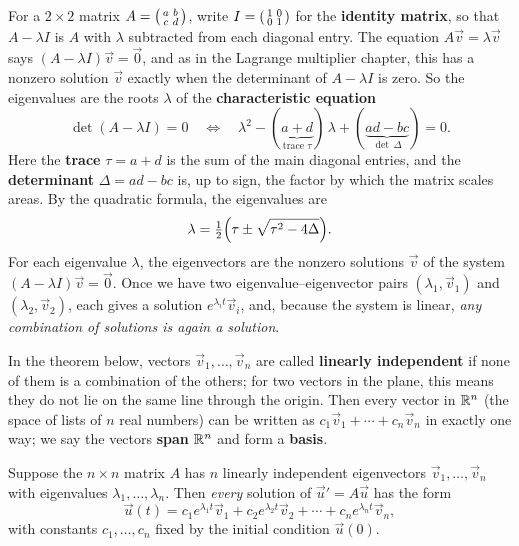 For a $2\times 2$ matrix
$A=\begin{psmallmatrix} a & b\\ c & d\end{psmallmatrix}$, write
$I=\begin{psmallmatrix} 1 & 0\\ 0 & 1\end{psmallmatrix}$ for the
\textbf{identity matrix}, so that $A-\lambda I$ is $A$ with $\lambda$ subtracted
from each diagonal entry. The equation $A\vec v=\lambda\vec v$ says
$(A-\lambda I)\vec v=\vec 0$, and as in the Lagrange multiplier chapter, this
has a nonzero solution $\vec v$ exactly when the determinant of $A-\lambda I$
is zero. So the eigenvalues are the roots $\lambda$ of the
\textbf{characteristic equation}
\[
  \det(A - \lambda I) = 0
  \quad\Longleftrightarrow\quad
  \lambda^2 - (\underbrace{a+d}_{\text{trace }\tau})\,\lambda
  + (\underbrace{ad-bc}_{\det\,\Delta}) = 0.
\]
Here the \textbf{trace} $\tau = a+d$ is the sum of the main diagonal entries, and
the \textbf{determinant} $\Delta = ad-bc$ is, up to sign, the factor by which the matrix scales areas.
By the quadratic formula, the eigenvalues are
\[
  \lambda = \tfrac{1}{2}\Bigl(\tau \pm \sqrt{\tau^2 - 4\Delta}\Bigr).
\]
For each
eigenvalue $\lambda$, the eigenvectors are the nonzero solutions $\vec v$ of the
system $(A-\lambda I)\vec v = \vec 0$. Once we have two
eigenvalue--eigenvector pairs $(\lambda_1, \vec v_1)$ and $(\lambda_2, \vec
v_2)$, each gives a solution $e^{\lambda_i t}\vec v_i$, and, because the system
is linear, \emph{any combination of solutions is again a solution}.

In the theorem below, vectors $\vec v_1, \dots, \vec v_n$ are called
\textbf{linearly independent} if none of them is a combination of the others;
for two vectors in the plane, this means they do not lie on the same line
through the origin. Then every vector in $\mathbb{R}^n$ (the space of lists of $n$ real
numbers) can be written as $c_1\vec v_1+\cdots+c_n\vec v_n$ in exactly one
way; we say the vectors \textbf{span} $\mathbb{R}^n$ and form a \textbf{basis}.

\begin{theorem}
\label{ch39:thm-gensol}
Suppose the $n\times n$ matrix $A$ has $n$ linearly independent eigenvectors
$\vec v_1, \dots, \vec v_n$ with eigenvalues $\lambda_1, \dots, \lambda_n$. Then
\emph{every} solution of $\vec u' = A\vec u$ has the form
\[
  \vec u(t) = c_1 e^{\lambda_1 t}\vec v_1
            + c_2 e^{\lambda_2 t}\vec v_2
            + \cdots
            + c_n e^{\lambda_n t}\vec v_n,
\]
with constants $c_1, \dots, c_n$ fixed by the initial condition $\vec u(0)$.
\end{theorem}

